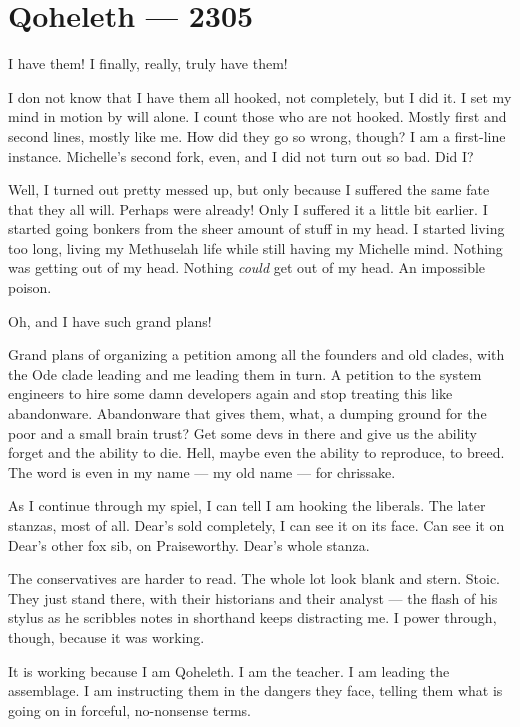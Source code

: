 \hypertarget{qoheleth-2305}{%
\chapter*{Qoheleth — 2305}\label{qoheleth-2305}}

I have them! I finally, really, truly have them!

I don not know that I have them all hooked, not completely, but I did it. I set my mind in motion by will alone. I count those who are not hooked. Mostly first and second lines, mostly like me. How did they go so wrong, though? I am a first-line instance. Michelle's second fork, even, and I did not turn out so bad. Did I?

Well, I turned out pretty messed up, but only because I suffered the same fate that they all will. Perhaps were already! Only I suffered it a little bit earlier. I started going bonkers from the sheer amount of stuff in my head. I started living too long, living my Methuselah life while still having my Michelle mind. Nothing was getting out of my head. Nothing \emph{could} get out of my head. An impossible poison.

Oh, and I have such grand plans!

Grand plans of organizing a petition among all the founders and old clades, with the Ode clade leading and me leading them in turn. A petition to the system engineers to hire some damn developers again and stop treating this like abandonware. Abandonware that gives them, what, a dumping ground for the poor and a small brain trust? Get some devs in there and give us the ability forget and the ability to die. Hell, maybe even the ability to reproduce, to breed. The word is even in my name — my old name — for chrissake.

As I continue through my spiel, I can tell I am hooking the liberals. The later stanzas, most of all. Dear's sold completely, I can see it on its face. Can see it on Dear's other fox sib, on Praiseworthy. Dear's whole stanza.

The conservatives are harder to read. The whole lot look blank and stern. Stoic. They just stand there, with their historians and their analyst — the flash of his stylus as he scribbles notes in shorthand keeps distracting me. I power through, though, because it was working.

It is working because I am Qoheleth. I am the teacher. I am leading the assemblage. I am instructing them in the dangers they face, telling them what is going on in forceful, no-nonsense terms.

